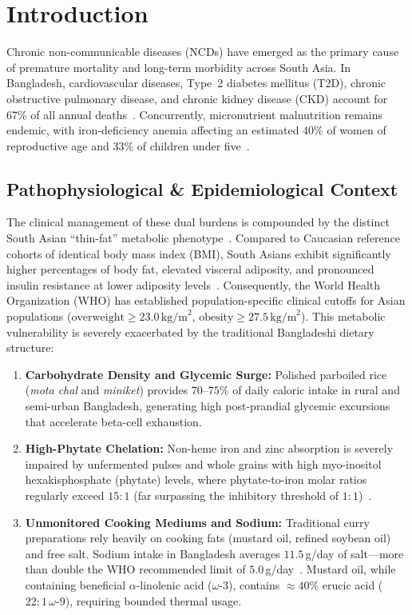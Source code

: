\documentclass[5p,times,twocolumn]{elsarticle}
\begin{document}
\section{Introduction}
\label{sec:introduction}

Chronic non-communicable diseases (NCDs) have emerged as the primary cause of premature mortality and long-term morbidity across South Asia. In Bangladesh, cardiovascular diseases, Type~2 diabetes mellitus (T2D), chronic obstructive pulmonary disease, and chronic kidney disease (CKD) account for 67\% of all annual deaths~\cite{who2023ncd}. Concurrently, micronutrient malnutrition remains endemic, with iron-deficiency anemia affecting an estimated 40\% of women of reproductive age and 33\% of children under five~\cite{biswas2024micronutrient, ahmed2019nutritional}. 

\subsection{Pathophysiological \& Epidemiological Context}
The clinical management of these dual burdens is compounded by the distinct South Asian ``thin-fat'' metabolic phenotype~\cite{who2004bmi}. Compared to Caucasian reference cohorts of identical body mass index (BMI), South Asians exhibit significantly higher percentages of body fat, elevated visceral adiposity, and pronounced insulin resistance at lower adiposity levels~\cite{who2004bmi}. Consequently, the World Health Organization (WHO) has established population-specific clinical cutoffs for Asian populations ($\text{overweight} \ge 23.0\,\text{kg/m}^2$, $\text{obesity} \ge 27.5\,\text{kg/m}^2$). This metabolic vulnerability is severely exacerbated by the traditional Bangladeshi dietary structure:
\begin{enumerate}[leftmargin=*,itemsep=1.5pt]
  \item \textbf{Carbohydrate Density and Glycemic Surge:} Polished parboiled rice (\textit{mota chal} and \textit{miniket}) provides $70$--$75\%$ of daily caloric intake in rural and semi-urban Bangladesh, generating high post-prandial glycemic excursions that accelerate beta-cell exhaustion.
  \item \textbf{High-Phytate Chelation:} Non-heme iron and zinc absorption is severely impaired by unfermented pulses and whole grains with high myo-inositol hexakisphosphate (phytate) levels, where phytate-to-iron molar ratios regularly exceed $15:1$ (far surpassing the inhibitory threshold of $1:1$)~\cite{hurrell2010iron}.
  \item \textbf{Unmonitored Cooking Mediums and Sodium:} Traditional curry preparations rely heavily on cooking fats (mustard oil, refined soybean oil) and free salt. Sodium intake in Bangladesh averages $11.5$\,g/day of salt—more than double the WHO recommended limit of $5.0$\,g/day~\cite{bdnac2023}. Mustard oil, while containing beneficial $\alpha$-linolenic acid ($\omega\text{-}3$), contains $\approx 40\%$ erucic acid ($22:1\,\omega\text{-}9$), requiring bounded thermal usage.
\end{enumerate}
\end{document}
